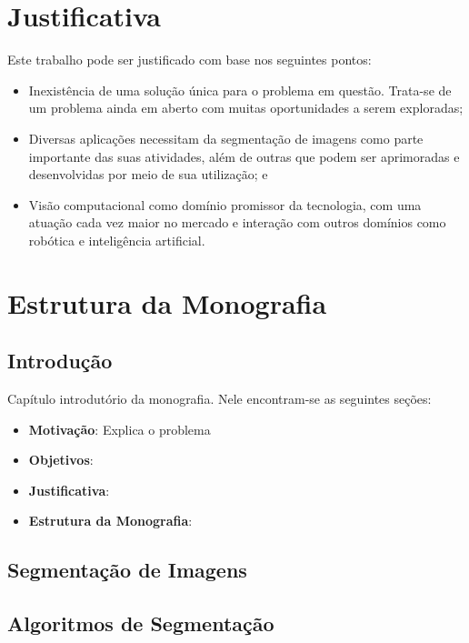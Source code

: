 \section{Justificativa}
Este trabalho pode ser justificado com base nos seguintes pontos:
\begin{itemize}
\item Inexistência de uma solução única para o problema em questão. Trata-se de um problema ainda em aberto com muitas oportunidades a serem exploradas;
\item Diversas aplicações necessitam da segmentação de imagens como parte importante das suas atividades, além de outras que podem ser aprimoradas e desenvolvidas por meio de sua utilização; e
\item Visão computacional como domínio promissor da tecnologia, com uma atuação cada vez maior no mercado e interação com outros domínios como robótica e inteligência artificial.
\end{itemize}

\section{Estrutura da Monografia}

\subsection{Introdução}
Capítulo introdutório da monografia. Nele encontram-se as seguintes seções:
\begin{itemize}
    \item \textbf{Motivação}: Explica o problema 
    \item \textbf{Objetivos}:
    \item \textbf{Justificativa}:
    \item \textbf{Estrutura da Monografia}:
\end{itemize}    

\subsection{Segmentação de Imagens}


\subsection{Algoritmos de Segmentação}


